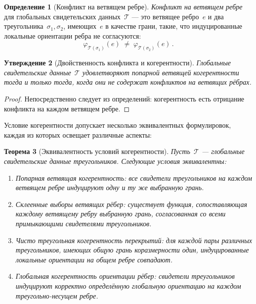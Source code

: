 \documentclass[11pt,a4paper]{article}
\theoremstyle{plain}
\newtheorem{theorem}{Теорема}[section]
\newtheorem{proposition}[theorem]{Утверждение}
\theoremstyle{definition}
\newtheorem{definition}[theorem]{Определение}
\theoremstyle{remark}
\newcommand{\cT}{\mathcal{T}}
\newcommand{\chosenface}{\varphi}
\begin{document}
\begin{definition}[Конфликт на ветвящем ребре]
\label{def:conflict}
\emph{Конфликт на ветвящем ребре} для глобальных свидетельских
данных~$\cT$ --- это ветвящее ребро~$e$ и два треугольника~$\sigma_1,
\sigma_2$, имеющих~$e$ в качестве грани, такие, что индуцированные
локальные ориентации ребра не согласуются:
\[
  \chosenface_{\cT(\sigma_1)}(e)
  \;\neq\; \chosenface_{\cT(\sigma_2)}(e)\,.
\]
\end{definition}

\begin{proposition}[Двойственность конфликта и когерентности]
\label{prop:conflict-iff}
Глобальные свидетельские данные~$\cT$ удовлетворяют попарной ветвящей
когерентности тогда и только тогда, когда они не содержат конфликтов
на ветвящих рёбрах.
\end{proposition}

\begin{proof}
Непосредственно следует из определений: когерентность есть отрицание
конфликта на каждом ветвящем ребре.
\end{proof}

Условие когерентности допускает несколько эквивалентных формулировок,
каждая из которых освещает различные аспекты:

\begin{theorem}[Эквивалентность условий когерентности]
\label{thm:equiv}
Пусть~$\cT$ --- глобальные свидетельские данные треугольников. Следующие
условия эквивалентны:
\begin{enumerate}[label=\textup{(\roman*)},nosep]
  \item \emph{Попарная ветвящая когерентность:}
        все свидетели треугольников на каждом ветвящем ребре индуцируют
        одну и ту же выбранную грань.
  \item \emph{Склеенные выборы ветвящих рёбер:}
        существует функция, сопоставляющая каждому ветвящему ребру
        выбранную грань, согласованная со всеми примыкающими свидетелями
        треугольников.
  \item \emph{Чисто треугольная когерентность перекрытий:}
        для каждой пары различных треугольников, имеющих общую грань
        коразмерности один, индуцированные локальные ориентации на
        общем ребре совпадают.
  \item \emph{Глобальная когерентность ориентации рёбер:}
        свидетели треугольников индуцируют корректно определённую
        глобальную ориентацию на каждом треугольно-несущем ребре.
\end{enumerate}
\end{theorem}
\end{document}
